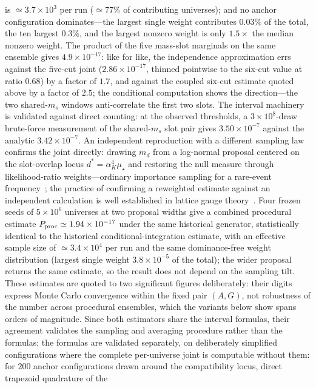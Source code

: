 \documentclass[aps,twocolumn,superscriptaddress,nofootinbib,floatfix]{revtex4-2}
\newcommand{\mstar}{\mu_\star}
\newcommand{\alphaK}{\alpha_K}
\begin{document}
is $\simeq3.7\times10^3$ per run ($\simeq77\%$ of contributing
universes); and no anchor configuration dominates---the largest single
weight contributes $0.03\%$ of the total, the ten largest $0.3\%$, and
the largest nonzero weight is only $1.5\times$ the median nonzero
weight. The product of the five mass-slot marginals on
the same ensemble gives $4.9\times10^{-17}$: like for like, the independence
approximation errs against the five-cut joint ($2.86\times10^{-17}$, thinned pointwise
to the six-cut value at ratio $0.68$) by a factor of $1.7$, and against the
coupled six-cut estimate quoted above by a factor of $2.5$; the conditional computation
shows the direction---the two shared-$m_s$ windows anti-correlate the first
two slots. The interval machinery is validated against direct counting:
at the observed thresholds, a $3\times10^8$-draw brute-force measurement
of the shared-$m_s$ slot pair gives $3.50\times10^{-7}$ against the
analytic $3.42\times10^{-7}$. An independent
reproduction with a different sampling law confirms the joint directly:
drawing $m_d$ from a log-normal proposal centered on the slot-overlap
locus $d^*=\alphaK^4\mstar$ and restoring the null measure through
likelihood-ratio weights---ordinary importance sampling for a
rare-event frequency~\cite{Bucklew2004}; the practice of confirming a
reweighted estimate against an independent calculation is well
established in lattice gauge theory~\cite{Caselle2016,Francesconi2020}.
Four frozen
seeds of $5\times10^6$ universes at two proposal widths give a combined procedural estimate
$P_{\rm proc}\simeq1.94\times10^{-17}$ under the same historical generator, statistically identical to the
historical conditional-integration estimate, with an effective sample size of
$\simeq3.4\times10^4$ per run and the same dominance-free weight
distribution (largest single weight $3.8\times10^{-5}$ of the total);
the wider proposal returns the same estimate, so the result does
not depend on the sampling tilt. These estimates are quoted to two
significant figures deliberately: their digits express Monte Carlo
convergence within the fixed pair $(A,G)$, not robustness of the number
across procedural ensembles, which the variants below show spans orders
of magnitude. Since both estimators share the
interval formulas, their agreement validates the sampling and averaging
procedure rather than the formulas; the formulas are validated separately,
on deliberately simplified configurations where the complete per-universe
joint is computable without them: for $200$ anchor configurations drawn
around the compatibility locus, direct trapezoid quadrature of the
\end{document}
